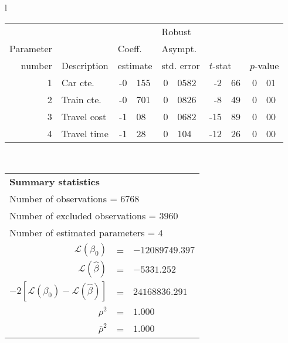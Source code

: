   \begin{tabular}{l}
\begin{tabular}{rlr@{.}lr@{.}lr@{.}lr@{.}l}
         &                       &   \multicolumn{2}{l}{}    & \multicolumn{2}{l}{Robust}  &     \multicolumn{4}{l}{}   \\
Parameter &                       &   \multicolumn{2}{l}{Coeff.}      & \multicolumn{2}{l}{Asympt.}  &     \multicolumn{4}{l}{}   \\
number &  Description                     &   \multicolumn{2}{l}{estimate}      & \multicolumn{2}{l}{std. error}  &   \multicolumn{2}{l}{$t$-stat}  &   \multicolumn{2}{l}{$p$-value}   \\

\hline

1 & Car cte. & -0&155 & 0&0582 & -2&66 & 0&01\\
2 & Train cte. & -0&701 & 0&0826 & -8&49 & 0&00\\
3 & Travel cost & -1&08 & 0&0682 & -15&89 & 0&00\\
4 & Travel time & -1&28 & 0&104 & -12&26 & 0&00\\
\hline
\end{tabular}
\\
\begin{tabular}{rcl}
\multicolumn{3}{l}{\bf Summary statistics}\\
\multicolumn{3}{l}{ Number of observations = $6768$} \\
\multicolumn{3}{l}{ Number of excluded observations = $3960$} \\
\multicolumn{3}{l}{ Number of estimated  parameters = $4$} \\
 $\mathcal{L}(\beta_0)$ &=&  $-12089749.397$ \\
 $\mathcal{L}(\hat{\beta})$ &=& $-5331.252 $  \\
 $-2[\mathcal{L}(\beta_0) -\mathcal{L}(\hat{\beta})]$ &=& $24168836.291$ \\
    $\rho^2$ &=&   $1.000$ \\
    $\bar{\rho}^2$ &=&    $1.000$ \\
\end{tabular}
  \end{tabular}
